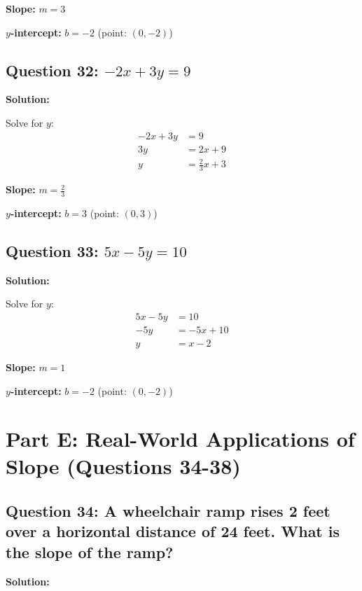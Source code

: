 \documentclass[12pt]{article}
\begin{document}
\textbf{Slope: } $m = 3$

\textbf{$y$-intercept: } $b = -2$ (point: $(0, -2)$)

\vspace{0.3cm}

\subsection*{Question 32: $-2x + 3y = 9$}

\noindent\textbf{Solution:}

Solve for $y$:
\begin{align*}
-2x + 3y &= 9 \\
3y &= 2x + 9 \\
y &= \frac{2}{3}x + 3
\end{align*}

\textbf{Slope: } $m = \frac{2}{3}$

\textbf{$y$-intercept: } $b = 3$ (point: $(0, 3)$)

\vspace{0.3cm}

\subsection*{Question 33: $5x - 5y = 10$}

\noindent\textbf{Solution:}

Solve for $y$:
\begin{align*}
5x - 5y &= 10 \\
-5y &= -5x + 10 \\
y &= x - 2
\end{align*}

\textbf{Slope: } $m = 1$

\textbf{$y$-intercept: } $b = -2$ (point: $(0, -2)$)

\newpage

\section{Part E: Real-World Applications of Slope (Questions 34-38)}

\subsection*{Question 34: A wheelchair ramp rises 2 feet over a horizontal distance of 24 feet. What is the slope of the ramp?}

\noindent\textbf{Solution:}
\end{document}
